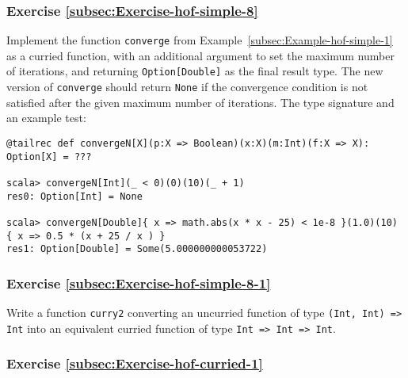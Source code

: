 \subsubsection{Exercise \label{subsec:Exercise-hof-simple-8}\ref{subsec:Exercise-hof-simple-8}}

Implement the function \lstinline!converge! from Example~\ref{subsec:Example-hof-simple-1}
as a curried function, with an additional argument to set the maximum
number of iterations, and returning \lstinline!Option[Double]! as
the final result type. The new version of \lstinline!converge! should
return \lstinline!None! if the convergence condition is not satisfied
after the given maximum number of iterations. The type signature and
an example test:
\begin{lstlisting}
@tailrec def convergeN[X](p:X => Boolean)(x:X)(m:Int)(f:X => X): Option[X] = ???

scala> convergeN[Int](_ < 0)(0)(10)(_ + 1)
res0: Option[Int] = None

scala> convergeN[Double]{ x => math.abs(x * x - 25) < 1e-8 }(1.0)(10) { x => 0.5 * (x + 25 / x ) }
res1: Option[Double] = Some(5.000000000053722)
\end{lstlisting}
\begin{comment}
Solution:
\begin{lstlisting}
def convergeN[X](p: X => Boolean)(x:X)(m:Int)(f: X => X): Option[X] =  {
              if (m <= 0) None
              else if (p(x)) Some(x) else converge(p)(f(x))(m-1)(f)             } // Defining as def convergeN[X]: (X => Boolean) => X => Int => (X => X) => Option[X] = ??? will break tail recursion!
\end{lstlisting}
\end{comment}


\subsubsection{Exercise \label{subsec:Exercise-hof-simple-8-1}\ref{subsec:Exercise-hof-simple-8-1}}

Write a function \lstinline!curry2! converting an uncurried function
of type \texttt{}\lstinline!(Int, Int) => Int! into an equivalent
curried function of type \texttt{}\lstinline!Int => Int => Int!.

\subsubsection{Exercise \label{subsec:Exercise-hof-curried-1}\ref{subsec:Exercise-hof-curried-1}}

